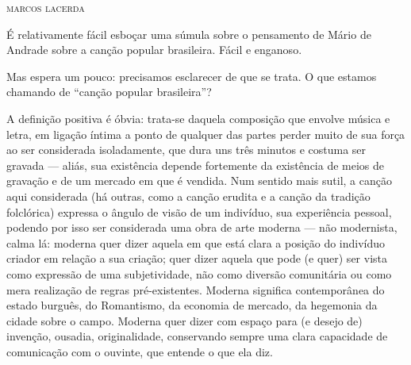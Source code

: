\begin{comment}
{\textbf{\emph{Dicionário musical
brasileiro:}}}

\begin{itemize}
\item
  \begin{quote}
  Canção
  \end{quote}
\item
  \begin{quote}
  Lundu
  \end{quote}
\item
  \begin{quote}
  Marcha
  \end{quote}
\item
  \begin{quote}
  Maxixe
  \end{quote}
\item
  \begin{quote}
  Modinha
  \end{quote}
\end{itemize}

{\textbf{\emph{Bibliografia}}}
\end{comment}




\begin{flushright}
\textsc{marcos lacerda}
\end{flushright}

\noindent{}É relativamente fácil esboçar uma súmula sobre o pensamento de Mário de
Andrade sobre a canção popular brasileira. Fácil e enganoso.

Mas espera um pouco: precisamos esclarecer de que se trata. O que
estamos chamando de ``canção popular brasileira''?

A definição positiva é óbvia: trata-se daquela composição que envolve
música e letra, em ligação íntima a ponto de qualquer das partes perder
muito de sua força ao ser considerada isoladamente, que dura uns três
minutos e costuma ser gravada --- aliás, sua existência depende
fortemente da existência de meios de gravação e de um mercado em que é
vendida. Num sentido mais sutil, a canção aqui considerada (há outras,
como a canção erudita e a canção da tradição folclórica) expressa o
ângulo de visão de um indivíduo, sua experiência pessoal, podendo por
isso ser considerada uma obra de arte moderna --- não modernista, calma
lá: moderna quer dizer aquela em que está clara a posição do indivíduo
criador em relação a sua criação; quer dizer aquela que pode (e quer)
ser vista como expressão de uma subjetividade, não como diversão
comunitária ou como mera realização de regras pré-existentes. Moderna
significa contemporânea do estado burguês, do Romantismo, da economia de
mercado, da hegemonia da cidade sobre o campo. Moderna quer dizer com
espaço para (e desejo de) invenção, ousadia, originalidade, conservando
sempre uma clara capacidade de comunicação com o ouvinte, que entende o
que ela diz.

